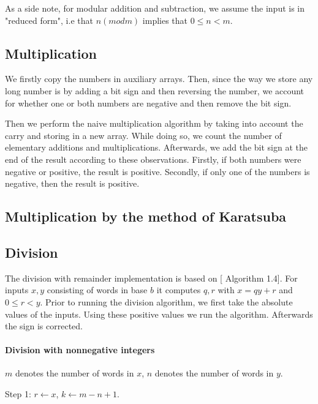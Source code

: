 \documentclass[a4paper]{article}
\begin{document}
As a side note, for modular addition and subtraction, we assume the input is in "reduced form", i.e that $n (mod m)$ implies that $0 \leq n < m.$


\subsection{Multiplication}

We firstly copy the numbers in auxiliary arrays. Then, since the way we store any long number is by adding a bit sign and then reversing the number, we account for whether one or both numbers are negative and then remove the bit sign. 

Then we perform the naive multiplication algorithm \cite{shoup} by taking into account the carry and storing in a new array. While doing so, we count the number of elementary additions and multiplications. Afterwards, we add the bit sign at the end of the result according to these observations. Firstly, if both numbers were negative or positive, the result is positive. Secondly, if only one of the numbers is negative, then the result is positive. 

\subsection{Multiplication by the method of Karatsuba}

\subsection{Division}

The division with remainder implementation is based on [\cite{ant} Algorithm 1.4].
For inputs $x, y$ consisting of words in base $b$ it computes $q, r$ with $x=qy+r$ and $0 \le r < y$.
Prior to running the division algorithm, we first take the absolute values of the inputs.
Using these positive values we run the algorithm.
Afterwards the sign is corrected.

\paragraph{Division with nonnegative integers}
$m$ denotes the number of words in $x$, $n$ denotes the number of words in $y$.

Step 1: $r \gets x$, $k \gets m - n + 1$.
\end{document}
